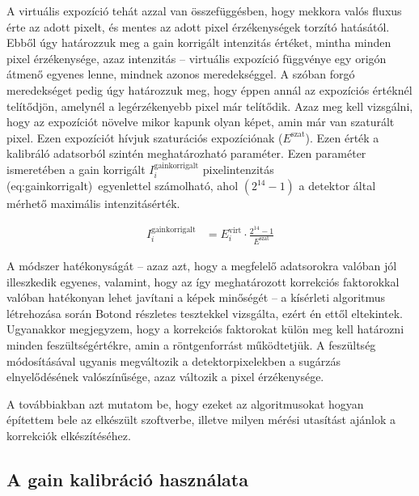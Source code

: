 \documentclass[a4paper,12pt,twoside]{article}
\begin{document}
 A virtuális expozíció tehát azzal van összefüggésben, hogy mekkora valós fluxus érte az adott pixelt, és mentes az adott pixel érzékenységek torzító hatásától. Ebből úgy határozzuk meg a gain korrigált intenzitás értéket, mintha minden pixel érzékenysége, azaz intenzitás -- virtuális expozíció függvénye egy origón átmenő egyenes lenne, mindnek azonos meredekséggel. A szóban forgó meredekséget pedig úgy határozzuk meg, hogy éppen annál az expozíciós értéknél telítődjön, amelynél a legérzékenyebb pixel már telítődik. Azaz meg kell vizsgálni, hogy az expozíciót növelve mikor kapunk olyan képet, amin már van szaturált pixel. Ezen expozíciót hívjuk szaturációs expozíciónak ($E^\text{szat}$). Ezen érték a kalibráló adatsorból szintén meghatározható paraméter. Ezen paraméter ismeretében a gain korrigált $ I_i^{\text{gainkorrigalt}}$ pixelintenzitás \aref({eq:gainkorrigalt})~egyenlettel számolható, ahol $\left(2^{14} -1\right)$ a detektor által mérhető maximális intenzitásérték.

\begin{equation}
\label{eq:gainkorrigalt}
\begin{split}
 I_i^{\text{gainkorrigalt}} &= E_i^{\text{virt}}  \cdot \frac{2^{14} -1}{E^\text{szat}}
 \end{split}
\end{equation}


A módszer hatékonyságát -- azaz azt, hogy a megfelelő adatsorokra valóban jól illeszkedik egyenes, valamint, hogy az így meghatározott korrekciós faktorokkal valóban hatékonyan lehet javítani a képek minőségét -- a kísérleti algoritmus létrehozása során Botond részletes tesztekkel vizsgálta, ezért én ettől eltekintek. Ugyanakkor megjegyzem, hogy a korrekciós faktorokat külön meg kell határozni minden feszültségértékre, amin a röntgenforrást működtetjük. A feszültség módosításával ugyanis megváltozik a detektorpixelekben a sugárzás elnyelődésének valószínűsége, azaz változik a pixel érzékenysége.


A továbbiakban azt mutatom be, hogy ezeket az algoritmusokat hogyan építettem bele az elkészült szoftverbe, illetve milyen mérési utasítást ajánlok a korrekciók elkészítéséhez.


\subsection{A gain kalibráció használata}
\end{document}
